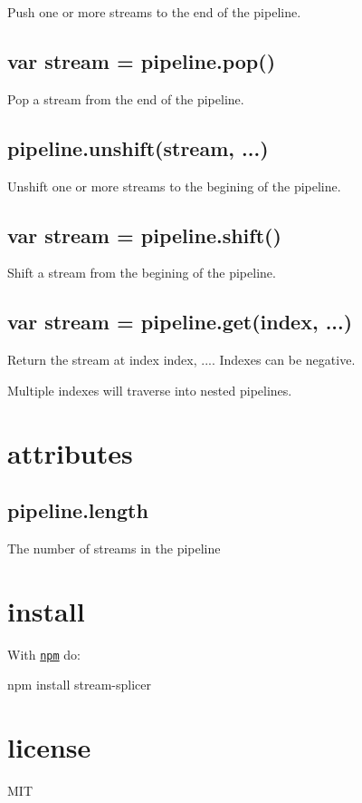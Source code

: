 Push one or more streams to the end of the pipeline.

\subsection*{var stream = pipeline.\+pop()}

Pop a stream from the end of the pipeline.

\subsection*{pipeline.\+unshift(stream, ...)}

Unshift one or more streams to the begining of the pipeline.

\subsection*{var stream = pipeline.\+shift()}

Shift a stream from the begining of the pipeline.

\subsection*{var stream = pipeline.\+get(index, ...)}

Return the stream at index {\ttfamily index, ...}. Indexes can be negative.

Multiple indexes will traverse into nested pipelines.

\section*{attributes}

\subsection*{pipeline.\+length}

The number of streams in the pipeline

\section*{install}

With \href{https://npmjs.org}{\tt npm} do\+:


\begin{DoxyCode}
npm install stream-splicer
\end{DoxyCode}


\section*{license}

M\+IT 